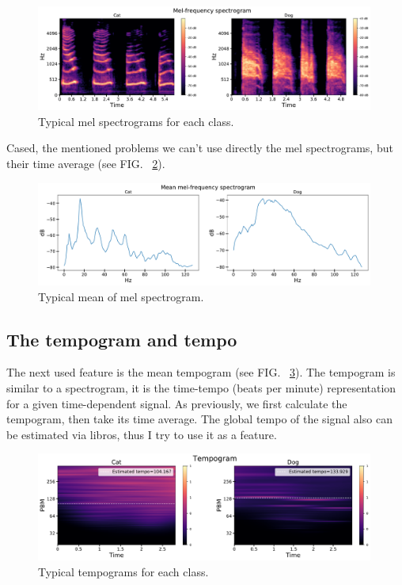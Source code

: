\documentclass[12pt a4paper]{article}
\numberwithin{equation}{section}
\begin{document}
\begin{figure}[H]
\centering
\includegraphics[width=0.99\textwidth]{fig/mel.pdf}
\caption{Typical mel spectrograms for each class.}
\label{fig4}
\end{figure}
Cased, the mentioned problems we can't use directly the mel spectrograms, but their time average (see FIG. ~\ref{fig5}).

\begin{figure}[H]
\centering
\includegraphics[width=0.99\textwidth]{fig/mel_pro.pdf}
\caption{Typical mean of mel spectrogram.}
\label{fig5}
\end{figure}

\subsection{The tempogram and tempo}

The next used feature is the mean tempogram (see FIG. ~\ref{fig6}).  The tempogram is similar to a spectrogram, it is the time-tempo (beats per minute) representation for a given time-dependent signal. As previously, we first calculate the tempogram, then take its time average. The global tempo of the signal also can be estimated via libros, thus I try to use it as a feature.

\begin{figure}[H]
\centering
\includegraphics[width=0.99\textwidth]{fig/tempogram.pdf}
\caption{Typical tempograms for each class.}
\label{fig6}
\end{figure}
\end{document}
